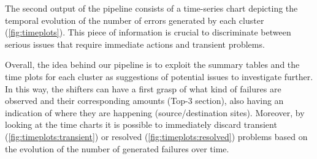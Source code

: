 The second output of the pipeline consists of a time-series chart depicting the temporal evolution of the number of errors generated by each cluster
(\cref{fig:timeplots}).
This piece of information is crucial to discriminate between serious issues that require immediate actions and transient problems. 

Overall, the idea behind our pipeline is to exploit the summary tables and the time plots for each cluster as suggestions of potential issues to investigate further.
In this way, the shifters can have a first grasp of what kind of failures are observed and their corresponding amounts (Top-3 section), also having an indication of where they are happening (source/destination sites).
Moreover, by looking at the time charts it is possible to immediately discard transient (\cref{fig:timeplots:transient}) or resolved (\cref{fig:timeplots:resolved}) problems based on the evolution of the number of generated failures over time.



